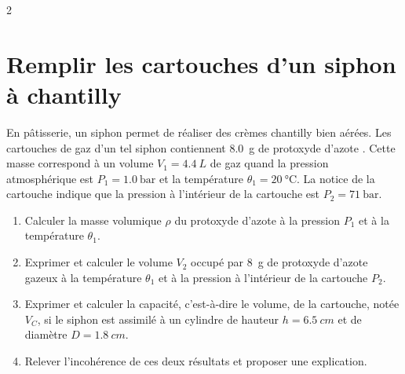 \documentclass[a4paper,11pt,fleqn]{article}%
\begin{document}
\begin{multicols}{2}
\section{Remplir les cartouches d'un siphon à chantilly}
En pâtisserie, un siphon permet de réaliser des crèmes chantilly bien aérées. Les cartouches de gaz d’un tel siphon contiennent \SI{8,0}{g} de protoxyde d’azote . Cette masse correspond à un volume $V_1 = \SI{4,4}{L}$ de gaz quand la pression atmosphérique est $P_1 = \SI{1,0}{\bar}$ et la température $\theta_1 = \SI{20}{\celsius}$. La notice de la cartouche indique que la pression à l'intérieur de la cartouche est $P_2 = \SI{71}{\bar}$.
\begin{enumerate}
	\item Calculer la masse volumique $\rho$ du protoxyde d'azote à la pression $P_1$ et à la température $\theta_1$.
	\item Exprimer et calculer le volume $V_2$ occupé par \SI{8}{g} de protoxyde d'azote gazeux  à la température $\theta_1$ et à  la pression à l’intérieur de la cartouche $P_2$.
	\item Exprimer et calculer la capacité, c'est-à-dire le volume, de la cartouche, notée $V_C$, si le siphon  est assimilé à un cylindre de hauteur $h = \SI{6,5}{cm}$ et de diamètre $D=\SI{1,8}{cm}$.
	\item Relever l'incohérence de ces deux résultats et proposer une explication.
	
\end{enumerate}
\end{multicols}
\end{document}

